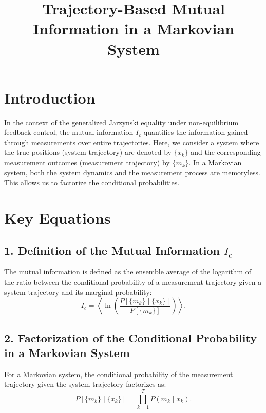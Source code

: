 \documentclass[12pt]{article}
\begin{document}
\title{Trajectory-Based Mutual Information in a Markovian System}
\author{}
\date{}
\maketitle

\section*{Introduction}

In the context of the generalized Jarzynski equality under non-equilibrium feedback control, the mutual information \(I_c\) quantifies the information gained through measurements over entire trajectories. Here, we consider a system where the true positions (system trajectory) are denoted by \(\{x_k\}\) and the corresponding measurement outcomes (measurement trajectory) by \(\{m_k\}\). In a Markovian system, both the system dynamics and the measurement process are memoryless. This allows us to factorize the conditional probabilities.

\section*{Key Equations}

\subsection*{1. Definition of the Mutual Information \(I_c\)}

The mutual information is defined as the ensemble average of the logarithm of the ratio between the conditional probability of a measurement trajectory given a system trajectory and its marginal probability:
\begin{equation}
I_c = \left\langle \ln \left( \frac{P[\{m_k\} \mid \{x_k\}]}{P[\{m_k\}]} \right) \right\rangle.
\end{equation}

\subsection*{2. Factorization of the Conditional Probability in a Markovian System}

For a Markovian system, the conditional probability of the measurement trajectory given the system trajectory factorizes as:
\begin{equation}
P[\{m_k\} \mid \{x_k\}] = \prod_{k=1}^{T} P(m_k \mid x_k).
\end{equation}
\end{document}
